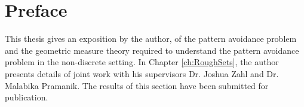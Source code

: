 
\chapter{Preface}

This thesis gives an exposition by the author, of the pattern avoidance problem and the geometric measure theory required to understand the pattern avoidance problem in the non-discrete setting. In Chapter \ref{ch:RoughSets}, the author presents details of joint work with his supervisors Dr. Joshua Zahl and Dr. Malabika Pramanik. The results of this section have been submitted for publication.